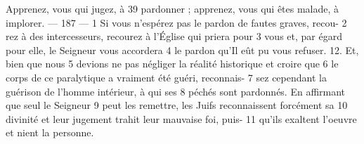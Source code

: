 Apprenez, vous qui jugez, à	 
39	 	pardonner ; apprenez, vous qui êtes malade, à implorer.	 
 	--- 187 ---	 
1	 	Si vous n'espérez pas le pardon de fautes graves, recou-	 
2	 	rez à des intercesseurs, recourez à l'Église qui priera pour	 
3	 	vous et, par égard pour elle, le Seigneur vous accordera	 
4	 	le pardon qu'Il eût pu vous refuser. 12. Et, bien que nous	 
5	 	devions ne pas négliger la réalité historique et croire que	 
6	 	le corps de ce paralytique a vraiment été guéri, reconnais-	 
7	 	sez cependant la guérison de l'homme intérieur, à qui ses	 
8	 	péchés sont pardonnés. En affirmant que seul le Seigneur	 
9	 	peut les remettre, les Juifs reconnaissent forcément sa	 
10	 	divinité et leur jugement trahit leur mauvaise foi, puis-	 
11	 	qu'ils exaltent l'oeuvre et nient la personne.